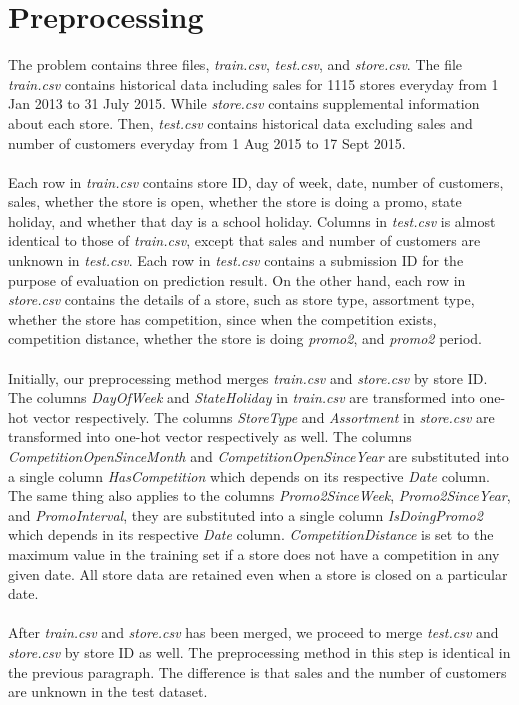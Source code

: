 \chapter{Preprocessing} \label{ch:preprocessing}
The problem contains three files, \textit{train.csv}, \textit{test.csv}, and \textit{store.csv}. The file \textit{train.csv} contains historical data including sales for 1115 stores everyday from 1 Jan 2013 to 31 July 2015. While \textit{store.csv} contains supplemental information about each store. Then, \textit{test.csv} contains historical data excluding sales and number of customers everyday from 1 Aug 2015 to 17 Sept 2015. \\ \\
Each row in \textit{train.csv} contains store ID, day of week, date, number of customers, sales, whether the store is open, whether the store is doing a promo, state holiday, and whether that day is a school holiday. Columns in \textit{test.csv} is almost identical to those of \textit{train.csv}, except that sales and number of customers are unknown in \textit{test.csv}. Each row in \textit{test.csv} contains a submission ID for the purpose of evaluation on prediction result. On the other hand, each row in \textit{store.csv} contains the details of a store, such as store type, assortment type, whether the store has competition, since when the competition exists, competition distance, whether the store is doing \textit{promo2}, and \textit{promo2} period. \\ \\
Initially, our preprocessing method merges \textit{train.csv} and \textit{store.csv} by store ID. The columns \textit{DayOfWeek} and \textit{StateHoliday} in \textit{train.csv}  are transformed into one-hot vector respectively. The columns \textit{StoreType} and \textit{Assortment} in \textit{store.csv} are transformed into one-hot vector respectively as well. The columns \textit{CompetitionOpenSinceMonth} and \textit{CompetitionOpenSinceYear} are substituted into a single column \textit{HasCompetition} which depends on its respective \textit{Date} column. The same thing also applies to the columns \textit{Promo2SinceWeek}, \textit{Promo2SinceYear}, and \textit{PromoInterval}, they are substituted into a single column \textit{IsDoingPromo2} which depends in its respective \textit{Date} column. \textit{CompetitionDistance} is set to the maximum value in the training set if a store does not have a competition in any given date. All store data are retained even when a store is closed on a particular date. \\ \\
After \textit{train.csv} and \textit{store.csv} has been merged, we proceed to merge \textit{test.csv} and \textit{store.csv} by store ID as well. The preprocessing method in this step is identical in the previous paragraph. The difference is that sales and the number of customers are unknown in the test dataset.